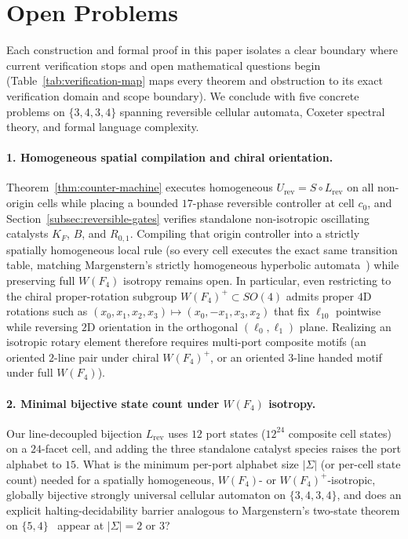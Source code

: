 \section{Open Problems}
\label{sec:open-problems}

Each construction and formal proof in this paper isolates a clear boundary where current verification stops and open mathematical questions begin (Table~\ref{tab:verification-map} maps every theorem and obstruction to its exact verification domain and scope boundary). We conclude with five concrete problems on $\{3,4,3,4\}$ spanning reversible cellular automata, Coxeter spectral theory, and formal language complexity.

\paragraph{1. Homogeneous spatial compilation and chiral orientation.}
Theorem~\ref{thm:counter-machine} executes homogeneous $U_{\mathrm{rev}} = S \circ L_{\mathrm{rev}}$ on all non-origin cells while placing a bounded $17$-phase reversible controller at cell $c_0$, and Section~\ref{subsec:reversible-gates} verifies standalone non-isotropic oscillating catalysts $K_F$, $B$, and $R_{0,1}$. Compiling that origin controller into a strictly spatially homogeneous local rule (so every cell executes the exact same transition table, matching Margenstern's strictly homogeneous hyperbolic automata~\cite{margenstern2024heptagrid}) while preserving full $W(F_4)$ isotropy remains open. In particular, even restricting to the chiral proper-rotation subgroup $W(F_4)^+ \subset SO(4)$ admits proper $4\mathrm{D}$ rotations such as $(x_0, x_1, x_2, x_3) \mapsto (x_0, -x_1, x_3, x_2)$ that fix $\ell_{10}$ pointwise while reversing $2\mathrm{D}$ orientation in the orthogonal $(\ell_0, \ell_1)$ plane. Realizing an isotropic rotary element therefore requires multi-port composite motifs (an oriented $2$-line pair under chiral $W(F_4)^+$, or an oriented $3$-line handed motif under full $W(F_4)$).

\paragraph{2. Minimal bijective state count under $W(F_4)$ isotropy.}
Our line-decoupled bijection $L_{\mathrm{rev}}$ uses $12$ port states ($12^{24}$ composite cell states) on a $24$-facet cell, and adding the three standalone catalyst species raises the port alphabet to $15$. What is the minimum per-port alphabet size $|\Sigma|$ (or per-cell state count) needed for a spatially homogeneous, $W(F_4)$- or $W(F_4)^+$-isotropic, globally bijective strongly universal cellular automaton on $\{3,4,3,4\}$, and does an explicit halting-decidability barrier analogous to Margenstern's two-state theorem on $\{5,4\}$~\cite{margenstern2018halting} appear at $|\Sigma| = 2$ or $3$?


